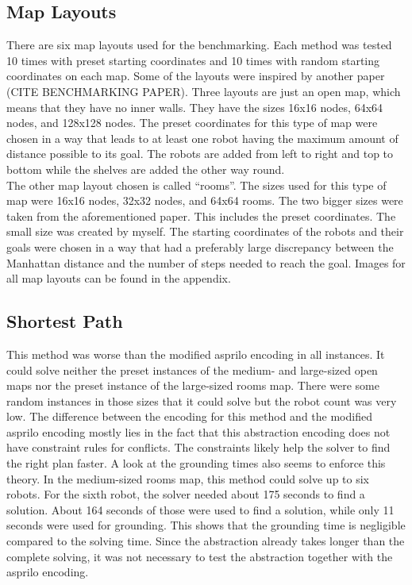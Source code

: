 \documentclass[runningheads]{llncs}
\begin{document}
\subsection{Map Layouts}
There are six map layouts used for the benchmarking. Each method was tested 10 times with preset starting coordinates and 10 times with random starting coordinates on each map. Some of the layouts were inspired by another paper (CITE BENCHMARKING PAPER). Three layouts are just an open map, which means that they have no inner walls. They have the sizes 16x16 nodes, 64x64 nodes, and 128x128 nodes. The preset coordinates for this type of map were chosen in a way that leads to at least one robot having the maximum amount of distance possible to its goal. The robots are added from left to right and top to bottom while the shelves are added the other way round. \\
The other map layout chosen is called ``rooms''. The sizes used for this type of map were 16x16 nodes, 32x32 nodes, and 64x64 rooms. The two bigger sizes were taken from the aforementioned paper. This includes the preset coordinates. The small size was created by myself. The starting coordinates of the robots and their goals were chosen in a way that had a preferably large discrepancy between the Manhattan distance and the number of steps needed to reach the goal. Images for all map layouts can be found in the appendix.
\subsection{Shortest Path}
This method was worse than the modified asprilo encoding in all instances. It could solve neither the preset instances of the medium- and large-sized open maps nor the preset instance of the large-sized rooms map. There were some random instances in those sizes that it could solve but the robot count was very low. The difference between the encoding for this method and the modified asprilo encoding mostly lies in the fact that this abstraction encoding does not have constraint rules for conflicts. The constraints likely help the solver to find the right plan faster. A look at the grounding times also seems to enforce this theory. In the medium-sized rooms map, this method could solve up to six robots. For the sixth robot, the solver needed about 175 seconds to find a solution. About 164 seconds of those were used to find a solution, while only 11 seconds were used for grounding. This shows that the grounding time is negligible compared to the solving time. Since the abstraction already takes longer than the complete solving, it was not necessary to test the abstraction together with the asprilo encoding. 
\end{document}
